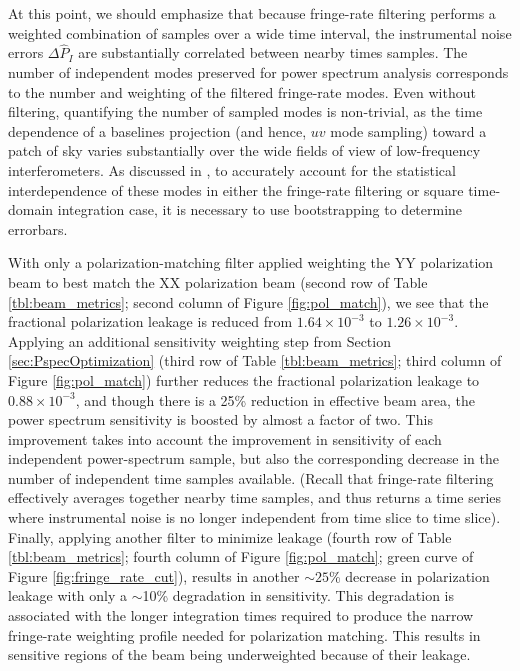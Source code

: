 \documentclass[twocolumn,apj,numberedappendix]{emulateapj}
\begin{document}
At this point, we should emphasize that because fringe-rate filtering performs
a weighted combination of samples over a wide time interval, the instrumental
noise errors $\Delta\widehat{P}_I$ are substantially correlated between nearby
times samples.  The number of independent modes preserved for power
spectrum analysis corresponds to the number and weighting of the filtered
fringe-rate modes.  Even without filtering,
quantifying the number of sampled modes is non-trivial, as the
time dependence of a baselines projection (and hence, $uv$ mode sampling) toward
a patch of sky varies substantially over the wide fields of view of
low-frequency interferometers.  As discussed in \citet{P14}, to
accurately account for the statistical interdependence of these modes in either the
fringe-rate filtering or square time-domain integration case, it is necessary
to use bootstrapping to determine errorbars. 

With only a polarization-matching filter applied weighting the YY polarization beam
to best match the XX polarization beam (second row of Table \ref{tbl:beam_metrics}; second column of Figure \ref{fig:pol_match}), we see that
the fractional polarization leakage is reduced from $1.64 \times 10^{-3}$ to $1.26 \times 10^{-3}$. Applying
an additional sensitivity weighting step from Section \ref{sec:PspecOptimization} (third row of Table \ref{tbl:beam_metrics}; third column of Figure \ref{fig:pol_match}) further reduces the fractional
polarization leakage to $0.88 \times 10^{-3}$, and though there is a 25\% reduction in effective
beam area, the power spectrum sensitivity is boosted by almost a factor of two. This improvement takes
into account the improvement in sensitivity of each independent power-spectrum sample, but
also the corresponding decrease in the number of independent time samples available. (Recall that fringe-rate filtering
effectively averages together nearby time samples, and thus returns a time series where instrumental noise
is no longer independent from time slice to time slice). Finally, applying
another filter to minimize leakage (fourth row of Table \ref{tbl:beam_metrics}; fourth column of Figure \ref{fig:pol_match}; green curve of Figure \ref{fig:fringe_rate_cut}), results in another $\sim25$\% decrease in polarization leakage with only a $\sim$10\% degradation
in sensitivity.  This degradation is associated with the 
longer integration times required to produce the narrow fringe-rate weighting profile needed for polarization
matching. This results in sensitive regions of the beam being underweighted because of their leakage.
\end{document}
